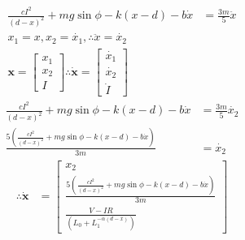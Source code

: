     \begin{align}
        \frac{c I^2}{(d - x)^2} + mg \sin{\phi} - k(x -d) - b \dot{x} &= \frac{3m}{5} \ddot{x} \\
        x_1 = x, x_2 = \dot{x_1}, \therefore \ddot{x} = \dot{x_2}\nonumber\\
        \bm{x} =
        \begin{bmatrix}
            x_1
            \\
            x_2
            \\
            I
        \end{bmatrix}
        \therefore \bm{\dot{x}} =
        \begin{bmatrix}
            \dot{x_1}
            \\
            \dot{x_2}
            \\
            \dot{I}
        \end{bmatrix} \nonumber
    \end{align}
    \begin{align}
        \frac{c I^2}{(d - x)^2} + mg \sin{\phi} - k(x -d) - b \dot{x} &= \frac{3m}{5} \dot{x_2} \nonumber\\
        \frac{5(\frac{c I^2}{(d - x)^2} + mg \sin{\phi} - k(x -d) - b \dot{x})}{3m} &= \dot{x_2} \nonumber
    \end{align}
    \begin{align}
        \therefore \bm{\dot{x}} &=
        \begin{bmatrix}
            x_2
            \\
            \frac{5(\frac{c I^2}{(d - x)^2} + mg \sin{\phi} - k(x -d) - b \dot{x})}{3m}
            \\
            \frac{V - IR}{(L_{0} + L_{1} ^{- \alpha (d - x)})}
        \end{bmatrix}
    \end{align}




